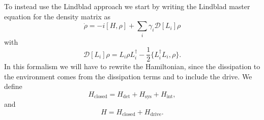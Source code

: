 To instead use the Lindblad approach we start by writing the Lindblad master equation for the density matrix as
\begin{equation}
    \dot{\rho} = -i [H, \rho] + \sum_i \gamma_i \mathcal{D}[L_i]\rho
\end{equation}
with
\begin{equation}
    \mathcal{D}[L_i]\rho = L_i \rho L_i^\dagger - \frac{1}{2} \{L_i^\dagger L_i, \rho\}.
\end{equation}
In this formalism we will have to rewrite the Hamiltonian, since the dissipation to the environment comes from the dissipation terms and to include the drive. We define
\begin{equation}
    H_\mathrm{closed} = H_\mathrm{det} + H_\mathrm{sys} + H_\mathrm{int},
\end{equation}
and
\begin{equation}
    H = H_\mathrm{closed} + H_\mathrm{drive}.
\end{equation}

